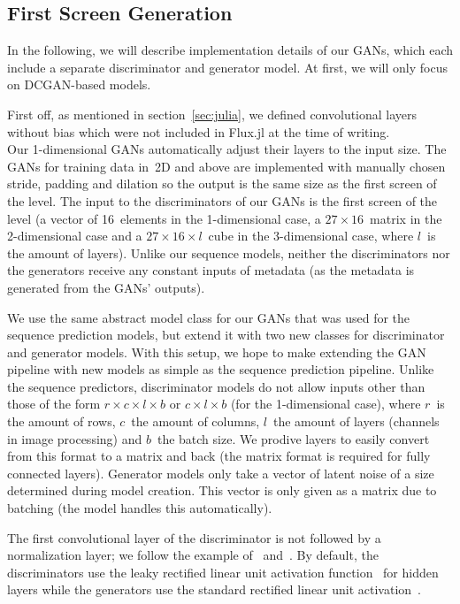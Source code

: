 \subsection{First Screen Generation}
\label{sec:first-screen-generation}


In the following, we will describe implementation details of our GANs,
which each include a separate discriminator and generator model.
At first, we will only focus on DCGAN-based models.

First off, as mentioned in section~\ref{sec:julia}, we defined
convolutional layers without bias which were not included in Flux.jl
at the time of writing. \\
Our 1-dimensional GANs automatically adjust their layers to the input
size. The GANs for training data in~2D and above are implemented with
manually chosen stride, padding and dilation so the output is the same
size as the first screen of the level. The input to the discriminators
of our GANs is the first screen of the level (a vector of 16~elements
in the 1-dimensional case, a $27 \times 16$~matrix in the
2-dimensional case and a $27 \times 16 \times l$~cube in the
3-dimensional case, where $l$~is the amount of layers). Unlike our
sequence models, neither the discriminators nor the generators receive
any constant inputs of metadata (as the metadata is generated from the
GANs' outputs).

We use the same abstract model class for our GANs that was used for
the sequence prediction models, but extend it with two new classes for
discriminator and generator models. With this setup, we hope to make
extending the GAN pipeline with new models as simple as the sequence
prediction pipeline. Unlike the sequence predictors, discriminator
models do not allow inputs other than those of the form
$r \times c \times l \times b$ or $c \times l \times b$ (for the
1-dimensional case), where $r$~is the amount of rows, $c$~the amount
of columns, $l$~the amount of layers (channels in image processing)
and $b$~the batch size. We prodive layers to easily convert from this
format to a matrix and back (the matrix format is required for fully
connected layers). Generator models only take a vector of latent noise
of a size determined during model creation. This vector is only given
as a matrix due to batching (the model handles this automatically).

The first convolutional layer of the discriminator is not followed by
a normalization layer; we follow the example
of~\cite{PytorchExamples2019}
and~\cite{martinarjovskyMartinarjovskyWassersteinGAN2019}. By default,
the discriminators use the leaky rectified linear unit activation
function~\cite{maasRectifierNonlinearitiesImprove,RectifierNeuralNetworks2019}
for hidden layers while the generators use the standard rectified
linear unit
activation~\cite{nairRectifiedLinearUnits,RectifierNeuralNetworks2019}.

